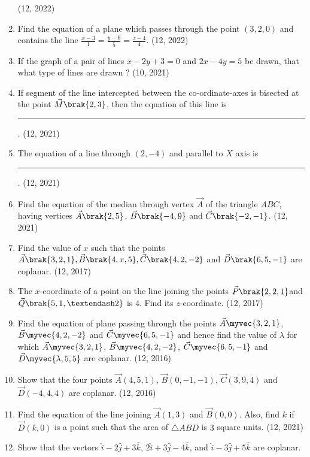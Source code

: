\begin{enumerate}[label=\thesubsection.\arabic*, ref=\thesubsection.\theenumi]
	\hfill (12, 2022)
\item Find the equation of a plane which passes through the point $(3,2,0)$ and contains the line $\frac{x-3}{1}=\frac{y-6}{5}=\frac{z-4}{4}$. \hfill (12, 2022)
\item If the graph of a pair of lines $ x - 2y + 3 = 0 $ and $ 2x - 4y = 5 $ be drawn, that what type of lines are drawn ? \hfill (10, 2021)
\item If segment of the line intercepted between the co-ordinate-axes is bisected
at the point $\vec{M}\brak{2, 3}$, then the equation of this line is
\rule{1cm}{0.1pt}.
\hfill (12, 2021)
\item The equation of a line through $(2,-4)$ and parallel to $X$ axis is \rule{1cm}{0.1pt}.
	\hfill (12, 2021)

\item Find the equation of the median through vertex $\vec{A}$ of the triangle $ABC$, having vertices $\vec{A}\brak{2,5}$, $\vec{B}\brak{-4,9}$ and $\vec{C}\brak{-2, -1}$. \hfill (12, 2021)
\item Find the value of $x$ such that the points $\vec{A}\brak{3,2,1}, \vec{B}\brak{4, x, 5}, \vec{C}\brak{4,2,-2}$ and $\vec{D}\brak{6,5,-1}$ are coplanar. \hfill (12, 2017)
\item The $x$-coordinate of a point on the line joining the points $\vec{P}\brak{2, 2, 1}$and $\vec{Q}\brak{5, 1,–2}$  is $4$. Find its $z$-coordinate. \hfill (12, 2017)
\item Find the equation of plane passing through the points $\vec{A}\myvec{3 , 2 , 1}$,
      $\vec{B}\myvec{4, 2, -2}$ and $\vec{C}\myvec{6, 5, -1}$ and hence find the value of $\lambda$ for which
      $\vec{A}\myvec{3, 2 , 1}$, $\vec{B}\myvec{4 , 2 , -2}$, $\vec{C}\myvec{6 , 5 , -1}$ and $\vec{D}\myvec{\lambda , 5 , 5}$
      are coplanar. \hfill (12, 2016)
\item Show that the four points $\vec{A}(4,5,1)$, $ \vec{B}(0,-1,-1)$,
      $\vec{C}(3,9,4)$ and $\vec{D}(-4,4,4)$ are coplanar. \hfill (12, 2016)
    \item Find the equation of the line joining $\vec{A}(1, 3)$ and $\vec{B}(0, 0)$.  Also, find $k$ if $\vec{D}(k, 0)$ is a point such that the area of $\triangle{ABD}$ is $3$ square units.
\hfill (12, 2021)
\item Show that the vectors $\hat{i} - 2\hat{j} + 3\hat{k}$, $2\hat{i} + 3\hat{j} - 4\hat{k}$, and $\hat{i} - 3\hat{j} + 5\hat{k}$ are coplanar. 


\end{enumerate}
